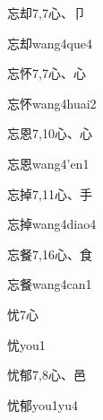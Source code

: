 \begin{Entry}{忘却}{7,7}{⼼、⼙}
  \begin{Phonetics}{忘却}{wang4que4}
  \end{Phonetics}
\end{Entry}

\begin{Entry}{忘怀}{7,7}{⼼、⼼}
  \begin{Phonetics}{忘怀}{wang4huai2}
  \end{Phonetics}
\end{Entry}

\begin{Entry}{忘恩}{7,10}{⼼、⼼}
  \begin{Phonetics}{忘恩}{wang4'en1}
  \end{Phonetics}
\end{Entry}

\begin{Entry}{忘掉}{7,11}{⼼、⼿}
  \begin{Phonetics}{忘掉}{wang4diao4}
  \end{Phonetics}
\end{Entry}

\begin{Entry}{忘餐}{7,16}{⼼、⾷}
  \begin{Phonetics}{忘餐}{wang4can1}
  \end{Phonetics}
\end{Entry}

\begin{Entry}{忧}{7}{⼼}
  \begin{Phonetics}{忧}{you1}
  \end{Phonetics}
\end{Entry}

\begin{Entry}{忧郁}{7,8}{⼼、⾢}
  \begin{Phonetics}{忧郁}{you1yu4}
  \end{Phonetics}
\end{Entry}

